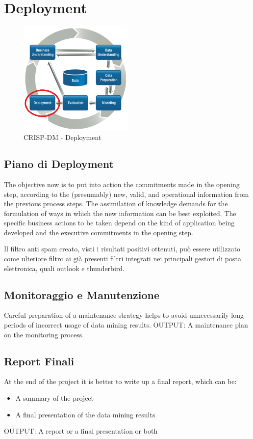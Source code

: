 \chapter{Deployment}

\begin{figure}[hbtp]
	\centering
	\includegraphics[width=0.5\textwidth]{./images/CRISPDM_6.png}
	\caption{CRISP-DM - Deployment}
	\label{CRISPDM_6}
\end{figure}
\section{Piano di Deployment}
The objective now is to put into action the commitments made in the opening step, according to the (presumably) new, valid, and operational information from the previous process steps.
The assimilation of knowledge demands for the formulation of ways in which the new information can be best exploited.
The specific business actions to be taken depend on the kind of application being developed and the executive commitments in the opening step.


Il filtro anti spam creato, visti i risultati positivi ottenuti, può essere utilizzato come ulteriore filtro ai già presenti filtri integrati nei principali gestori di posta elettronica, quali outlook e thunderbird.
\section{Monitoraggio e Manutenzione}
Careful preparation of a maintenance strategy helps to
avoid unnecessarily long periods of incorrect usage of
data mining results.
OUTPUT:
A maintenance plan on the monitoring process.
\section{Report Finali}
At the end of the project it is better to write up a final
report, which can be:
\begin{itemize}
	\item A summary of the project
	\item A final presentation of the data mining results
\end{itemize}
OUTPUT:
A report or a final presentation or both
